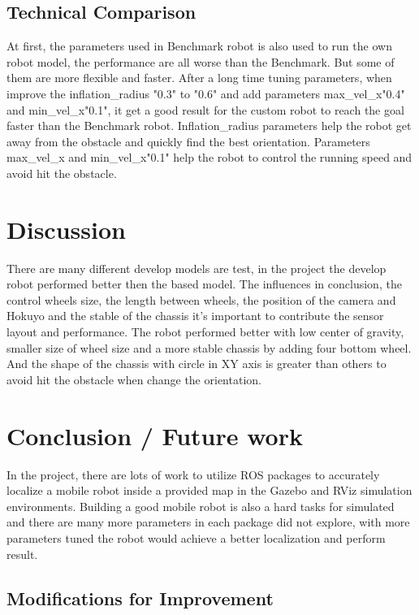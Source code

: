 \documentclass[10pt,journal,compsoc]{IEEEtran}
\begin{document}
\subsection{Technical Comparison} 
At first, the parameters used in Benchmark robot is also used to run the own robot model, the performance are all worse than the Benchmark. But some of them are more flexible and faster. After a long time tuning parameters, when improve the inflation\_radius "0.3" to "0.6" and add parameters max\_vel\_x"0.4" and min\_vel\_x"0.1", it get a good result for the custom robot to reach the goal faster than the Benchmark robot. Inflation\_radius parameters help the robot get away from the obstacle and quickly find the 
best orientation. Parameters max\_vel\_x  and min\_vel\_x"0.1" help the robot to control the running speed and avoid hit the obstacle.

\section{Discussion}
There are many different develop models are test, in the project the develop robot performed better then the based model. The influences in conclusion, the control wheels size, the length between wheels, the position of the camera and Hokuyo and the stable of the chassis it's important to contribute the sensor layout and performance. The robot performed better with low center of gravity, smaller size of wheel size and a more stable chassis by adding four bottom wheel. And the shape of the chassis with circle in XY axis is greater than others to avoid hit the obstacle when change the orientation.

\section{Conclusion / Future work}

In the project, there are lots of work to utilize ROS packages to accurately localize a mobile robot inside a provided map in the Gazebo and RViz simulation environments. Building a good mobile robot is also a hard tasks for simulated and there are many more parameters in each package did not explore, with more parameters tuned the robot would achieve a better localization and perform result.


\subsection{Modifications for Improvement}
\end{document}
